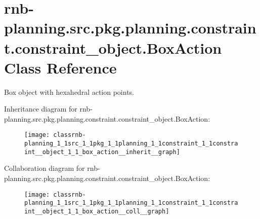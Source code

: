 \hypertarget{classrnb-planning_1_1src_1_1pkg_1_1planning_1_1constraint_1_1constraint__object_1_1_box_action}{}\section{rnb-\/planning.src.\+pkg.\+planning.\+constraint.\+constraint\+\_\+object.\+Box\+Action Class Reference}
\label{classrnb-planning_1_1src_1_1pkg_1_1planning_1_1constraint_1_1constraint__object_1_1_box_action}


Box object with hexahedral action points.  




Inheritance diagram for rnb-\/planning.src.\+pkg.\+planning.\+constraint.\+constraint\+\_\+object.\+Box\+Action\+:\nopagebreak
\begin{figure}[H]
\begin{center}
\leavevmode
\texttt{[image: classrnb-planning\_1\_1src\_1\_1pkg\_1\_1planning\_1\_1constraint\_1\_1constraint\_\_object\_1\_1\_box\_action\_\_inherit\_\_graph]}
\end{center}
\end{figure}


Collaboration diagram for rnb-\/planning.src.\+pkg.\+planning.\+constraint.\+constraint\+\_\+object.\+Box\+Action\+:\nopagebreak
\begin{figure}[H]
\begin{center}
\leavevmode
\texttt{[image: classrnb-planning\_1\_1src\_1\_1pkg\_1\_1planning\_1\_1constraint\_1\_1constraint\_\_object\_1\_1\_box\_action\_\_coll\_\_graph]}
\end{center}
\end{figure}

